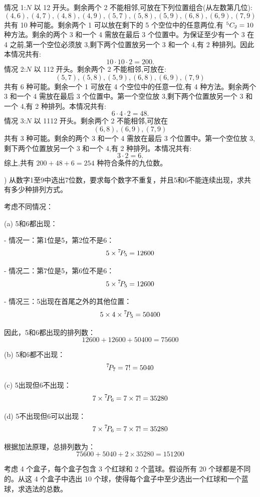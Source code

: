 \begin{questions}
\begin{solution}
        情况 1:$N$ 以 12 开头。剩余两个 2 不能相邻,可放在下列位置组合(从左数第几位):
        \[
        (4,6),(4,7),(4,8),(4,9),(5,7),(5,8),(5,9),(6,8),(6,9),(7,9)
        \]
        共有 10 种可能。剩余两个 1 可以放在剩下的 5 个空位中的任意两位,有 ${}^{5}C_{2}=10$ 种方法。剩余的两个 3 和一个 4 需放在最后 3 个位置中。为保证至少有一个 3 在 4 之前,第一个空位必须放 3,剩下两个位置放另一个 3 和一个 4,有 2 种排列。因此本情况共有:
        \[
        10 \cdot 10 \cdot 2 = 200.
        \]
        情况 2:$N$ 以 112 开头。剩余两个 2 不能相邻,可放在:
        \[
        (5,7),(5,8),(5,9),(6,8),(6,9),(7,9)
        \]
        共有 6 种可能。剩余一个 1 可放在 4 个空位中的任意一位,有 4 种方法。剩余两个 3 和一个 4 需放在最后 3 个位置中。第一个空位放 3,剩下两个位置放另一个 3 和一个 4,有 2 种排列。本情况共有:
        \[
        6 \cdot 4 \cdot 2 = 48.
        \]
        情况 3:$N$ 以 1112 开头。剩余两个 2 不能相邻,可放在
        \[
        (6,8),(6,9),(7,9)
        \]
        共有 3 种可能。剩余的两个 3 和一个 4 需放在最后 3 个位置中。第一个空位放 3,剩下两个位置放另一个 3 和一个 4,有 2 种排列。本情况共有:
        \[
        3 \cdot 2 = 6.
        \]
        综上,共有 $200 + 48 + 6 = 254$ 种符合条件的九位数。
    \end{solution}

    ) 从数字1至9中选出7位数，要求每个数字不重复，并且5和6不能连续出现，求共有多少种排列方式。

\begin{solution}
考虑不同情况：

(a) 5和6都出现：

- 情况一：第1位是5，第2位不是6：
\[
5 \times {}^{7}\!P_{5} = 12600
\]

- 情况二：第7位是5，第6位不是6：
\[
5 \times {}^{7}\!P_{5} = 12600
\]

- 情况三：5出现在首尾之外的其他位置：
\[
5 \times 4 \times {}^{7}\!P_{5} = 50400
\]

因此，5和6都出现的排列数：
\[
12600 + 12600 + 50400 = 75600
\]

(b) 5和6都不出现：
\[
{}^{7}\!P_{7} = 7! = 5040
\]

(c) 5出现但6不出现：
\[
7 \times {}^{7}\!P_{6} = 7 \times 7! = 35280
\]

(d) 5不出现但6可以出现：
\[
7 \times {}^{7}\!P_{6} = 7 \times 7! = 35280
\]

根据加法原理，总排列数为：
\[
75600 + 5040 + 2 \times 35280 = 151200
\]
\end{solution}

\question
考虑 4 个盒子，每个盒子包含 3 个红球和 2 个蓝球。假设所有 20 个球都是不同的。从这 4 个盒子中选出 10 个球，使得每个盒子中至少选出一个红球和一个蓝球，求选法的总数。


\end{questions}
